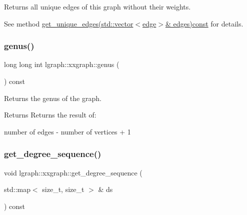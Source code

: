 Returns all unique edges of this graph without their weights. 

See method \hyperlink{classlgraph_1_1wxgraph_a6c1de8061b1606071320a01dd1b5fe64}{get\+\_\+unique\+\_\+edges(std\+::vector$<$edge$>$\& edges)const} for details. \mbox{\label{classlgraph_1_1xxgraph_a5f48a91046766e3e0b71a3326f2b9153}} 
\subsubsection{\texorpdfstring{genus()}{genus()}}
{\footnotesize\ttfamily long long int lgraph\+::xxgraph\+::genus (\begin{DoxyParamCaption}{ }\end{DoxyParamCaption}) const\hspace{0.3cm}{\ttfamily [inherited]}}



Returns the genus of the graph. 

\begin{DoxyReturn}{Returns}
Returns the result of\+: \begin{DoxyVerb}number of edges - number of vertices + 1
\end{DoxyVerb}
 
\end{DoxyReturn}
\mbox{\label{classlgraph_1_1xxgraph_a5b21b51f5f9c55c05c0e8e5bc836bf87}} 
\subsubsection{\texorpdfstring{get\+\_\+degree\+\_\+sequence()}{get\_degree\_sequence()}}
{\footnotesize\ttfamily void lgraph\+::xxgraph\+::get\+\_\+degree\+\_\+sequence (\begin{DoxyParamCaption}\item[{std\+::map$<$ size\+\_\+t, size\+\_\+t $>$ \&}]{ds }\end{DoxyParamCaption}) const\hspace{0.3cm}{\ttfamily [inherited]}}



